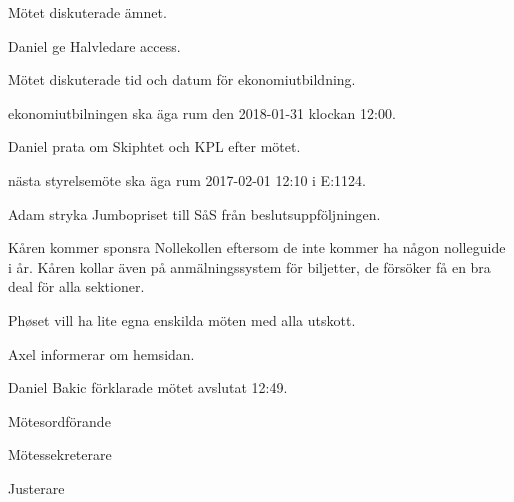 \documentclass[10pt]{article}
\def\mo{Daniel Bakic}
\def\ms{Axel Voss}
\def\ji{Adam Belfrage}
\begin{document}
\begin{paragrafer}
Mötet diskuterade ämnet.

Daniel \ypa ge Halvledare access.

\Mbaby
{}
Mötet diskuterade tid och datum för ekonomiutbildning.

\Mba ekonomiutbilningen ska äga rum den 2018-01-31 klockan 12:00.

Daniel \ypa prata om Skiphtet och KPL efter mötet.

\Mbaby

\Mba nästa styrelsemöte ska äga rum 2017-02-01 12:10 i E:1124.

Adam \ypa stryka Jumbopriset till SåS från beslutsuppföljningen.

\Mbaby

Kåren kommer sponsra Nollekollen eftersom de inte kommer ha någon nolleguide i år.
Kåren kollar även på anmälningssystem för biljetter, de försöker få en bra deal för alla sektioner.

Phøset vill ha lite egna enskilda möten med alla utskott.

Axel informerar om hemsidan.

{\mo} förklarade mötet avslutat 12:49.
\end{paragrafer}

\hidesignfoot
\begin{signatures}{3}
\signature{\mo}{Mötesordförande}
\signature{\ms}{Mötessekreterare}
\signature{\ji}{Justerare}
\end{signatures}
\end{document}
